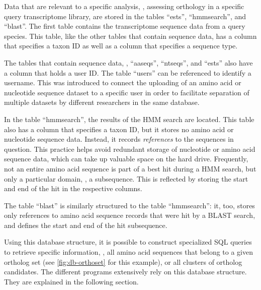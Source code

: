 Data that are relevant to a specific analysis, \eg, assessing orthology in a
specific query transcriptome library, are stored in the tables ``ests'',
``hmmsearch'', and ``blast''.  The first table contains the transcriptome
sequence data from a query species.  This table, like the other tables that
contain sequence data, has a column that specifies a taxon ID as well as a
column that specifies a sequence type.

The tables that contain sequence data, \ie, ``aaseqs'', ``ntseqs'', and ``ests''
also have a column that holds a user ID. The table ``users'' can be referenced
to identify a username. This was introduced to connect the uploading of an amino
acid or nucleotide sequence dataset to a specific user in order to facilitate
separation of multiple datasets by different researchers in the same database.

In the table ``hmmsearch'', the results of the HMM search are located. This
table also has a column that specifies a taxon ID, but it stores no amino acid
or nucleotide sequence data. Instead, it records \emph{references} to the
sequences in question. This practice helps avoid redundant storage of nucleotide
or amino acid sequence data, which can take up valuable space on the hard drive.
Frequently, not an entire amino acid sequence is part of a best hit during a HMM
search, but only a particular domain, \ie, a subsequence. This is reflected by
storing the start and end of the hit in the respective columns. 

The table ``blast'' is similarly structured to the table ``hmmsearch'': it, too,
stores only references to amino acid sequence records that were hit by a BLAST
search, and defines the start and end of the hit subsequence.

Using this database structure, it is possible to construct specialized SQL
queries to retrieve specific information, \eg, all amino acid sequences that
belong to a given ortholog set (see \autoref{fig:db-orthoset} for this example),
or all clusters of ortholog candidates. The different \pname programs
extensively rely on this database structure. They are explained in the following
section.





